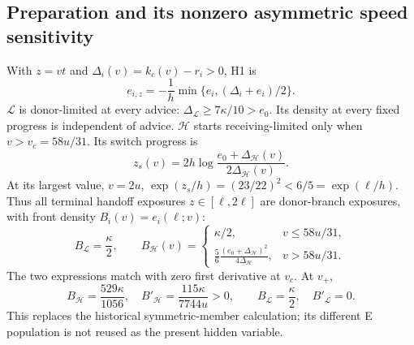 \documentclass[11pt,a4paper]{article}
\newcommand{\kc}{k_c}
\begin{document}
\subsection{Preparation and its nonzero asymmetric speed sensitivity}
With $z=vt$ and $\Delta_i(v)=\kc(v)-r_i>0$, H1 is
\begin{equation}
 e_{i,z}=-\frac1h\min\{e_i,(\Delta_i+e_i)/2\}.
 \label{eq:h1}
\end{equation}
$\mathcal L$ is donor-limited at every advice: $\Delta_{\mathcal L}\geq
7\kappa/10>e_0$. Its density at every fixed progress is independent of
advice. $\mathcal H$ starts receiving-limited only when
$v>v_c=58u/31$. Its switch progress is
\begin{equation}
 z_s(v)=2h\log\frac{e_0+\Delta_{\mathcal H}(v)}{2\Delta_{\mathcal H}(v)}.
 \label{eq:switch}
\end{equation}
At its largest value, $v=2u$, $\exp(z_s/h)=(23/22)^2<6/5=\exp(\ell/h)$.
Thus all terminal handoff exposures $z\in[\ell,2\ell]$ are donor-branch
exposures, with front density $B_i(v)=e_i(\ell;v)$:
\begin{equation}
 B_{\mathcal L}=\frac\kappa2,\qquad
 B_{\mathcal H}(v)=
 \begin{cases}
 \kappa/2,&v\leq58u/31,\\[2pt]
 \displaystyle\frac56\frac{(e_0+\Delta_{\mathcal H})^2}{4\Delta_{\mathcal H}},
 &v>58u/31.
 \end{cases}\label{eq:front}
\end{equation}
The two expressions match with zero first derivative at $v_c$. At $v_+$,
\begin{equation}
 B_{\mathcal H}=\frac{529\kappa}{1056},\quad
 B'_{\mathcal H}=\frac{115\kappa}{7744u}>0,\qquad
 B_{\mathcal L}=\frac\kappa2,\quad B'_{\mathcal L}=0.
 \label{eq:frontvalues}
\end{equation}
This replaces the historical symmetric-member calculation; its different E
population is not reused as the present hidden variable.
\end{document}
